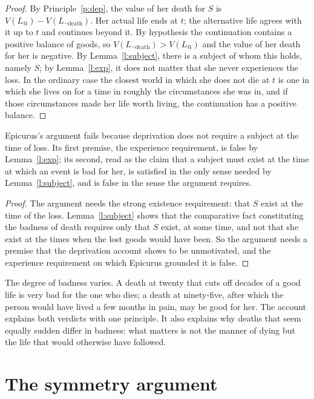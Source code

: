 \documentclass{situationist-preprint}
\begin{document}
\begin{proof}
By Principle~\ref{p:dep}, the value of her death for $S$ is $V(L_{@}) - V(L_{\neg\text{death}})$. Her actual life ends at $t$; the alternative life agrees with it up to $t$ and continues beyond it. By hypothesis the continuation contains a positive balance of goods, so $V(L_{\neg\text{death}}) > V(L_{@})$ and the value of her death for her is negative. By Lemma~\ref{l:subject}, there is a subject of whom this holds, namely $S$; by Lemma~\ref{l:exp}, it does not matter that she never experiences the loss. In the ordinary case the closest world in which she does not die at $t$ is one in which she lives on for a time in roughly the circumstances she was in, and if those circumstances made her life worth living, the continuation has a positive balance.
\end{proof}

\begin{corollary}\label{c:epic}
Epicurus's argument fails because deprivation does not require a subject at the time of loss. Its first premise, the experience requirement, is false by Lemma~\ref{l:exp}; its second, read as the claim that a subject must exist at the time at which an event is bad for her, is satisfied in the only sense needed by Lemma~\ref{l:subject}, and is false in the sense the argument requires.
\end{corollary}

\begin{proof}
The argument needs the strong existence requirement: that $S$ exist at the time of the loss. Lemma~\ref{l:subject} shows that the comparative fact constituting the badness of death requires only that $S$ exist, at some time, and not that she exist at the times when the lost goods would have been. So the argument needs a premise that the deprivation account shows to be unmotivated, and the experience requirement on which Epicurus grounded it is false.
\end{proof}

The degree of badness varies. A death at twenty that cuts off decades of a good life is very bad for the one who dies; a death at ninety-five, after which the person would have lived a few months in pain, may be good for her. The account explains both verdicts with one principle. It also explains why deaths that seem equally sudden differ in badness: what matters is not the manner of dying but the life that would otherwise have followed.

\section{The symmetry argument}\label{s:sym}
\end{document}
